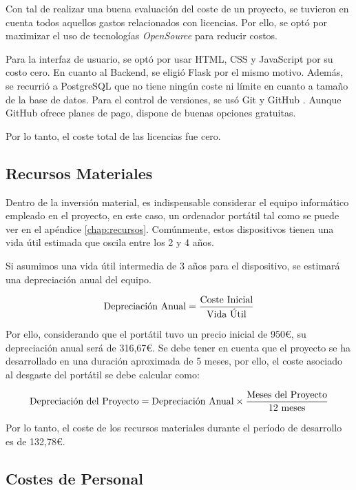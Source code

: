 Con tal de realizar una buena evaluación del coste de un proyecto, se tuvieron en cuenta todos aquellos gastos relacionados con licencias. Por ello, se optó por maximizar el uso de tecnologías \textit{OpenSource} para reducir costos.

Para la interfaz de usuario, se optó por usar HTML, CSS y JavaScript por su costo cero. En cuanto al Backend, se eligió Flask por el mismo motivo. Además, se recurrió a PostgreSQL que no tiene ningún coste ni límite en cuanto a tamaño de la base de datos. Para el control de versiones, se usó Git y GitHub \cite{personalgithub}. Aunque GitHub ofrece planes de pago, dispone de buenas opciones gratuitas. 

Por lo tanto, el coste total de las licencias fue cero. 

\subsection{Recursos Materiales}

Dentro de la inversión material, es indispensable considerar el equipo informático empleado en el proyecto, en este caso, un ordenador portátil tal como se puede ver en el apéndice \ref{chap:recursos}. Comúnmente, estos dispositivos tienen una vida útil estimada que oscila entre los 2 y 4 años. 

Si asumimos una vida útil intermedia de 3 años para el dispositivo, se estimará una depreciación anual del equipo. 

\begin{equation}
    \centering
    \text{Depreciación Anual} = \frac{\text{Coste Inicial}}{\text{Vida Útil}}
\end{equation}

Por ello, considerando que el portátil tuvo un precio inicial de 950€, su depreciación anual será de 316,67€. Se debe tener en cuenta que el proyecto se ha desarrollado en una duración aproximada de 5 meses, por ello, el coste asociado al desgaste del portátil se debe calcular como:

\begin{equation}
    \centering
    \text{Depreciación del Proyecto} = \text{Depreciación Anual} \times \frac{\text{Meses del Proyecto}}{12 \text{ meses}}
\end{equation}

Por lo tanto, el coste de los recursos materiales durante el período de desarrollo es de 132,78€.

\subsection{Costes de Personal}

